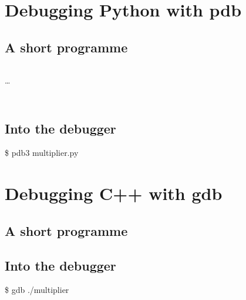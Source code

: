 \mode*

\section{Debugging Python with pdb}

\subsection{A short programme}

\begin{frame}
  \inputminted[firstline=1,lastline=4,linenos]{python}{examples/multiplier.py}
  \dots
  \inputminted[firstline=13,linenos]{python}{examples/multiplier.py}
\end{frame}

\begin{frame}
  \inputminted[linenos,firstline=6,lastline=11]{python}{examples/multiplier.py}
\end{frame}

\subsection{Into the debugger}

\begin{frame}
  \$ pdb3 multiplier.py
\end{frame}


\section{Debugging C++ with gdb}

\subsection{A short programme}






\subsection{Into the debugger}

\begin{frame}
  \$ gdb ./multiplier
\end{frame}

